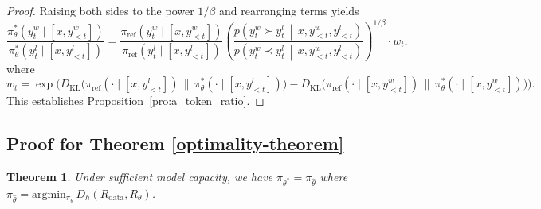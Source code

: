 \documentclass{article}
\theoremstyle{plain}
\newtheorem*{theorem*}{Theorem}
\theoremstyle{definition}
\theoremstyle{remark}
\begin{document}
\begin{proof}
Raising both sides to the power $1/\beta$ and rearranging terms yields
\begin{equation*}
\frac{
\pi_\theta^*(y_t^w \mid [x,y_{<t}^w])
}{
\pi_\theta^*(y_t^l \mid [x,y_{<t}^l])
}
=
\frac{
\pi_{\mathrm{ref}}(y_t^w \mid [x,y_{<t}^w])
}{
\pi_{\mathrm{ref}}(y_t^l \mid [x,y_{<t}^l])
}
\left(
\frac{
p\!\left(
y_t^w \succ y_t^l
\,\middle|\,
x, y_{<t}^w, y_{<t}^l
\right)
}{
p\!\left(
y_t^w \prec y_t^l
\,\middle|\,
x, y_{<t}^w, y_{<t}^l
\right)
}
\right)^{1/\beta}
\cdot w_t,
\end{equation*}
where
\begin{equation*}
w_t
=
\exp\!\Big(
D_{\mathrm{KL}}\!\big(
\pi_{\mathrm{ref}}(\cdot\mid[x,y_{<t}^l])
\,\big\|\,
\pi_\theta^*(\cdot\mid[x,y_{<t}^l])
\big)
-
D_{\mathrm{KL}}\!\big(
\pi_{\mathrm{ref}}(\cdot\mid[x,y_{<t}^w])
\,\big\|\,
\pi_\theta^*(\cdot\mid[x,y_{<t}^w])
\big)
\Big).
\end{equation*}
This establishes Proposition~\ref{pro:a_token_ratio}.
\end{proof}

\subsection{Proof for Theorem \ref{optimality-theorem}}
\begin{theorem*}
    Under sufficient model capacity, we have $\pi_{\theta^{*}}=\pi_{\hat{\theta}}$ where $\pi_{\hat{\theta}}=\text{argmin}{}_{\pi_{\theta}}\,D_{h}\left(R_{\text{data}},R_{\theta}\right)$.
\end{theorem*}
\end{document}
